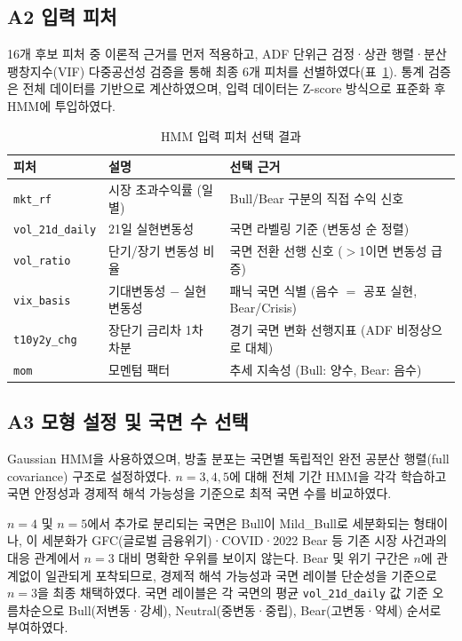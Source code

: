 \documentclass[eng]{kjas3}
\begin{document}
\subsection*{A2 입력 피처}

16개 후보 피처 중 이론적 근거를 먼저 적용하고, ADF 단위근 검정·상관 행렬·분산팽창지수(VIF) 다중공선성 검증을 통해 최종 6개 피처를 선별하였다(표~\ref{tab:a1_features}). 통계 검증은 전체 데이터를 기반으로 계산하였으며, 입력 데이터는 Z-score 방식으로 표준화 후 HMM에 투입하였다.

\begin{table}[t]
\centering
\caption{HMM 입력 피처 선택 결과}
\label{tab:a1_features}
\begin{tabular}{lll}
\toprule
\textbf{피처} & \textbf{설명} & \textbf{선택 근거} \\
\midrule
\texttt{mkt\_rf}       & 시장 초과수익률 (일별)     & Bull/Bear 구분의 직접 수익 신호 \\
\texttt{vol\_21d\_daily} & 21일 실현변동성           & 국면 라벨링 기준 (변동성 순 정렬) \\
\texttt{vol\_ratio}    & 단기/장기 변동성 비율      & 국면 전환 선행 신호 ($>$1이면 변동성 급증) \\
\texttt{vix\_basis}    & 기대변동성 $-$ 실현변동성  & 패닉 국면 식별 (음수 $=$ 공포 실현, Bear/Crisis) \\
\texttt{t10y2y\_chg}   & 장단기 금리차 1차 차분     & 경기 국면 변화 선행지표 (ADF 비정상으로 대체) \\
\texttt{mom}           & 모멘텀 팩터               & 추세 지속성 (Bull: 양수, Bear: 음수) \\
\bottomrule
\end{tabular}
\end{table}

\subsection*{A3 모형 설정 및 국면 수 선택}

Gaussian HMM을 사용하였으며, 방출 분포는 국면별 독립적인 완전 공분산 행렬(full covariance) 구조로 설정하였다. $n = 3, 4, 5$에 대해 전체 기간 HMM을 각각 학습하고 국면 안정성과 경제적 해석 가능성을 기준으로 최적 국면 수를 비교하였다.

$n = 4$ 및 $n = 5$에서 추가로 분리되는 국면은 Bull이 Mild\_Bull로 세분화되는 형태이나, 이 세분화가 GFC(글로벌 금융위기)·COVID·2022 Bear 등 기존 시장 사건과의 대응 관계에서 $n = 3$ 대비 명확한 우위를 보이지 않는다. Bear 및 위기 구간은 $n$에 관계없이 일관되게 포착되므로, 경제적 해석 가능성과 국면 레이블 단순성을 기준으로 $n = 3$을 최종 채택하였다. 국면 레이블은 각 국면의 평균 \texttt{vol\_21d\_daily} 값 기준 오름차순으로 Bull(저변동·강세), Neutral(중변동·중립), Bear(고변동·약세) 순서로 부여하였다.
\end{document}
